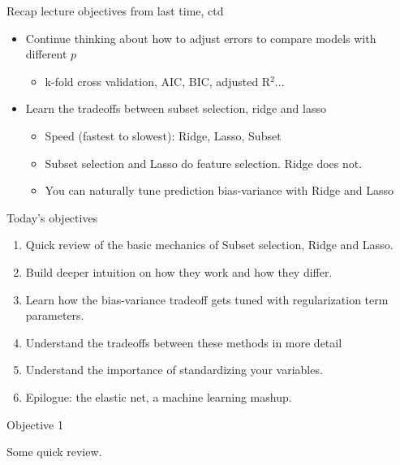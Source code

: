 \documentclass[mathserif, handout, aspectratio=169]{beamer}
\begin{document}
\begin{frame}{Recap lecture objectives from last time, ctd}
\begin{itemize}
\item Continue thinking about how to adjust errors to compare models with different $p$
\begin{itemize}
\item<2-> k-fold cross validation, AIC, BIC, adjusted R$^2$...
\end{itemize}

\vspace{5mm}
\item Learn the tradeoffs between subset selection, ridge and lasso
\begin{itemize}
\item<3-> Speed (fastest to slowest): Ridge, Lasso, Subset
\item<3-> Subset selection and Lasso do feature selection.  Ridge does not.
\item<3-> You can naturally tune prediction bias-variance with Ridge and Lasso
\end{itemize}
\end{itemize}
\end{frame}

\begin{frame}{Today's objectives}

\begin{enumerate}
\item Quick review of the basic mechanics of Subset selection, Ridge and Lasso.
\item Build deeper intuition on how they work and how they differ.
\item Learn how the bias-variance tradeoff gets tuned with regularization term parameters. 
\item Understand the tradeoffs between these methods in more detail
\item Understand the importance of standardizing your variables.
\item Epilogue: the elastic net, a machine learning mashup.  
\end{enumerate}

\end{frame}

\begin{frame}{Objective 1}

Some quick review.

\end{frame}
\end{document}

